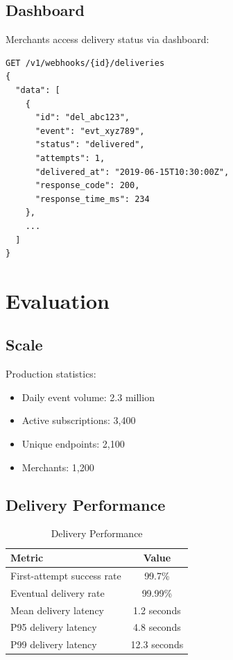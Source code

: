 \documentclass[11pt,a4paper]{article}
\begin{document}
\subsection{Dashboard}

Merchants access delivery status via dashboard:

\begin{lstlisting}[caption=Delivery Status API]
GET /v1/webhooks/{id}/deliveries
{
  "data": [
    {
      "id": "del_abc123",
      "event": "evt_xyz789",
      "status": "delivered",
      "attempts": 1,
      "delivered_at": "2019-06-15T10:30:00Z",
      "response_code": 200,
      "response_time_ms": 234
    },
    ...
  ]
}
\end{lstlisting}

\section{Evaluation}

\subsection{Scale}

Production statistics:

\begin{itemize}
    \item Daily event volume: 2.3 million
    \item Active subscriptions: 3,400
    \item Unique endpoints: 2,100
    \item Merchants: 1,200
\end{itemize}

\subsection{Delivery Performance}

\begin{table}[h]
\centering
\caption{Delivery Performance}
\begin{tabular}{lc}
\toprule
\textbf{Metric} & \textbf{Value} \\
\midrule
First-attempt success rate & 99.7\% \\
Eventual delivery rate & 99.99\% \\
Mean delivery latency & 1.2 seconds \\
P95 delivery latency & 4.8 seconds \\
P99 delivery latency & 12.3 seconds \\
\bottomrule
\end{tabular}
\end{table}
\end{document}
